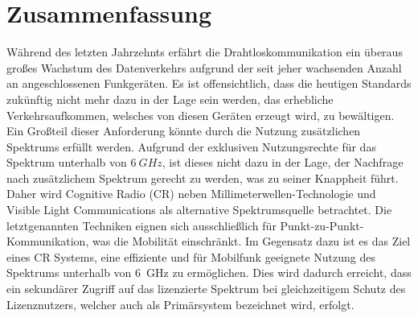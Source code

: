 \chapter*{Zusammenfassung}
W\"ahrend des letzten Jahrzehnts erf\"ahrt die Drahtloskommunikation ein \"uberaus großes Wachstum des Datenverkehrs aufgrund der seit jeher wachsenden Anzahl an angeschlossenen Funkger\"aten. Es ist offensichtlich, dass die heutigen Standards zuk\"unftig nicht mehr dazu in der Lage sein werden, das erhebliche Verkehrsaufkommen, welsches von diesen Ger\"aten erzeugt wird, zu bew\"altigen. Ein Großteil dieser Anforderung k\"onnte durch die Nutzung zusätzlichen Spektrums erf\"ullt werden. Aufgrund der exklusiven Nutzungsrechte für das Spektrum unterhalb von $\SI{6}{GHz}$, ist dieses nicht dazu in der Lage, der Nachfrage nach zus\"atzlichem Spektrum gerecht zu werden, was zu seiner Knappheit führt. Daher wird Cognitive Radio (CR) neben Millimeterwellen-Technologie und Visible Light Communications als alternative Spektrumsquelle betrachtet. Die letztgenannten Techniken eignen sich ausschließlich für Punkt-zu-Punkt-Kommunikation, was die Mobilität einschränkt. Im Gegensatz dazu ist es das Ziel eines CR Systems, eine effiziente und für Mobilfunk geeignete Nutzung des Spektrums unterhalb von \SI{6}{GHz} zu ermöglichen. Dies wird dadurch erreicht, dass ein sekundärer Zugriff auf das lizenzierte Spektrum bei gleichzeitigem Schutz des Lizenznutzers, welcher auch als Primärsystem bezeichnet wird, erfolgt. 

\cleardoublepage

